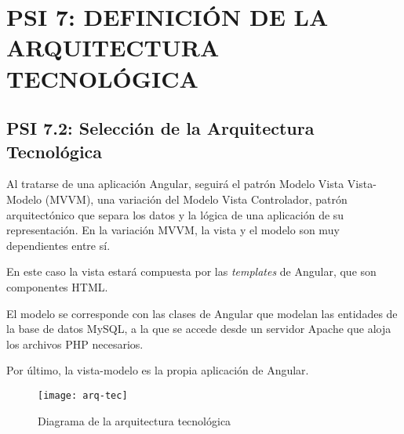% 
%
%
%


% 


\newpage

\section{PSI 7: DEFINICIÓN DE LA ARQUITECTURA TECNOLÓGICA}


\subsection{PSI 7.2: Selección de la Arquitectura Tecnológica} 
Al tratarse de una aplicación Angular, seguirá el patrón Modelo Vista Vista-Modelo (MVVM), una variación del Modelo Vista Controlador, patrón arquitectónico que separa los datos y la lógica de una aplicación de su representación. En la variación MVVM, la vista y el modelo son muy dependientes entre sí. \par 
En este caso la vista estará compuesta por las \textit{templates} de Angular, que son componentes HTML.\par
El modelo se corresponde con las clases de Angular que modelan las entidades de la base de datos MySQL, a la que se accede desde un servidor Apache que aloja los archivos PHP necesarios.\par
Por último, la vista-modelo es la propia aplicación de Angular.
\begin{figure}[H]
\centering
\centerline{\texttt{[image: arq-tec]}}
\caption{Diagrama de la arquitectura tecnológica}
\end{figure}